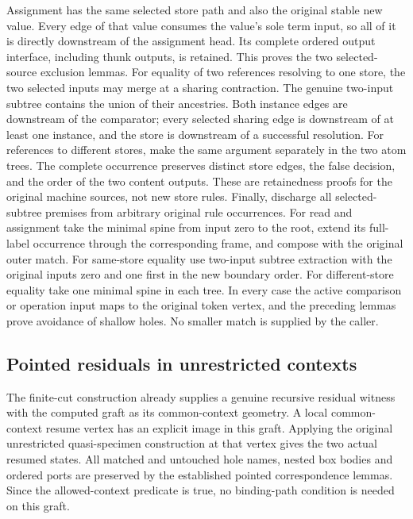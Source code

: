 Assignment has the same selected store path and also the original stable
new value. Every edge of that value consumes the value's sole term input,
so all of it is directly downstream of the assignment head. Its complete
ordered output interface, including thunk outputs, is retained. This proves
the two selected-source exclusion lemmas.
For equality of two references resolving to one store, the two selected
inputs may merge at a sharing contraction. The genuine two-input subtree
contains the union of their ancestries. Both instance edges are downstream
of the comparator; every selected sharing edge is downstream of at least
one instance, and the store is downstream of a successful resolution.
For references to different stores, make the same argument separately in
the two atom trees. The complete occurrence preserves distinct store edges,
the false decision, and the order of the two content outputs. These are
retainedness proofs for the original machine sources, not new store rules.
Finally, discharge all selected-subtree premises from arbitrary original
rule occurrences. For read and assignment take the minimal spine from input
zero to the root, extend its full-label occurrence through the corresponding
frame, and compose with the original outer match. For same-store equality
use two-input subtree extraction with the original inputs zero and one
first in the new boundary order. For different-store equality take one
minimal spine in each tree. In every case the active comparison or operation
input maps to the original token vertex, and the preceding lemmas prove
avoidance of shallow holes. No smaller match is supplied by the caller.
\par{}

\subsection{Pointed residuals in unrestricted contexts}
The finite-cut construction already supplies a genuine recursive residual
witness with the computed graft as its common-context geometry. A local
common-context resume vertex has an explicit image in this graft. Applying
the original unrestricted quasi-specimen construction at that vertex gives
the two actual resumed states. All matched and untouched hole names, nested
box bodies and ordered ports are preserved by the established pointed
correspondence lemmas. Since the allowed-context predicate is true, no
binding-path condition is needed on this graft.

